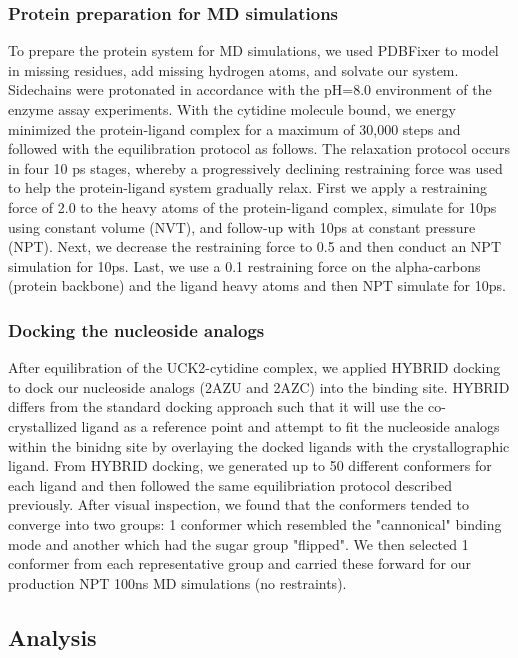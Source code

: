 \documentclass[fleqn,10pt]{wlscirep}
\begin{document}
\subsubsection{Protein preparation for MD simulations}
To prepare the protein system for MD simulations, we used PDBFixer \cite{pdbfixer} to model in missing residues, add missing hydrogen atoms, and solvate our system.
Sidechains were protonated in accordance with the pH=8.0 environment \cite{tanaka et. al 4} of the enzyme assay experiments.
With the cytidine molecule bound, we energy minimized the protein-ligand complex for a maximum of 30,000 steps and followed with the equilibration protocol as follows.
The relaxation protocol occurs in four 10 ps stages, whereby a progressively declining restraining force was used to help the protein-ligand system gradually relax.
First we apply a restraining force of 2.0 to the heavy atoms of the protein-ligand complex, simulate for 10ps using constant volume (NVT), and follow-up with 10ps at constant pressure (NPT).
Next, we decrease the restraining force to 0.5 and then conduct an NPT simulation for 10ps.
Last, we use a 0.1 restraining force on the alpha-carbons (protein backbone) and the ligand heavy atoms and then NPT simulate for 10ps.

\subsubsection{Docking the nucleoside analogs}
After equilibration of the UCK2-cytidine complex, we applied HYBRID docking \cite{} to dock our nucleoside analogs (2AZU and 2AZC) into the binding site.
HYBRID differs from the standard docking approach such that it will use the co-crystallized ligand as a reference point and attempt to fit the nucleoside analogs within the binidng site by overlaying the docked ligands with the crystallographic ligand.
From HYBRID docking, we generated up to 50 different conformers for each ligand and then followed the same equilibriation protocol described previously.
After visual inspection, we found that the conformers tended to converge into two groups: 1 conformer which resembled the "cannonical" binding mode and another which had the sugar group "flipped".
We then selected 1 conformer from each representative group and carried these forward for our production NPT 100ns MD simulations (no restraints).

\subsection{Analysis}
\end{document}
